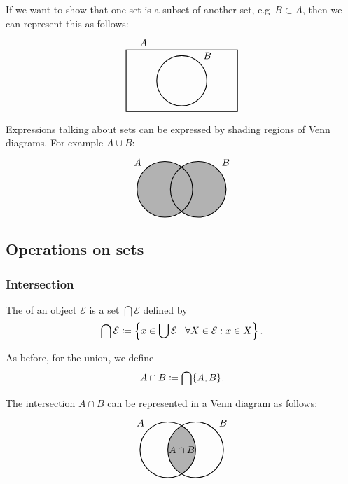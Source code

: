 If we want to show that one set is a subset of another set, e.g\ $B\subset A$, then we can represent this as follows:
\[ \begin{tikzpicture}[thick]
\node [draw,
    rectangle,
    minimum width =4cm,
	minimum height = 2.2cm,
    label={135:$A$}] (A) at (0,0){};
\node [draw,
    circle,
    minimum size =1.8cm,
    label={45:$B$}] (B) at (0,0){};
\end{tikzpicture} \]

Expressions talking about sets can be expressed by shading regions of Venn diagrams. For example $A\cup B$:
\[ \begin{tikzpicture}[thick,
    set/.style = {circle,
        minimum size = 2cm,
        fill=black!30}]

\node[set,label={135:$A$}] (A) at (0,0) {};

\node[set,label={45:$B$}] (B) at (1.2,0) {};

\draw (0,0) circle(1cm);
\draw (1.2,0) circle(1cm);
\end{tikzpicture} \]

\subsection{Operations on sets}
\subsubsection{Intersection}
\begin{definition}
The  of an object $\mathcal{E}$ is a set $\bigcap \mathcal{E}$ defined by
\[ \bigcap \mathcal{E} \coloneqq \left\{ x\in \bigcup\mathcal{E} \;|\; \forall X\in \mathcal{E}: x\in X \right\}. \]
\end{definition}
As before, for the union, we define
\[ A\cap B \coloneqq \bigcap \{A,B\}. \]

The intersection $A\cap B$ can be represented in a Venn diagram as follows:
\[ \begin{tikzpicture}[thick,
    set/.style = {circle,
        minimum size = 2cm}]

\node[set,label={135:$A$}] (A) at (0,0) {};

\node[set,label={45:$B$}] (B) at (1,0) {};

\begin{scope}
    \clip (0,0) circle(1cm);
    \clip (1,0) circle(1cm);
    \fill[black!30](0,0) circle(1cm);
\end{scope}

\draw (0,0) circle(1cm);
\draw (1,0) circle(1cm);

\node at (0.5,0) {$A\cap B$};
\end{tikzpicture} \]

